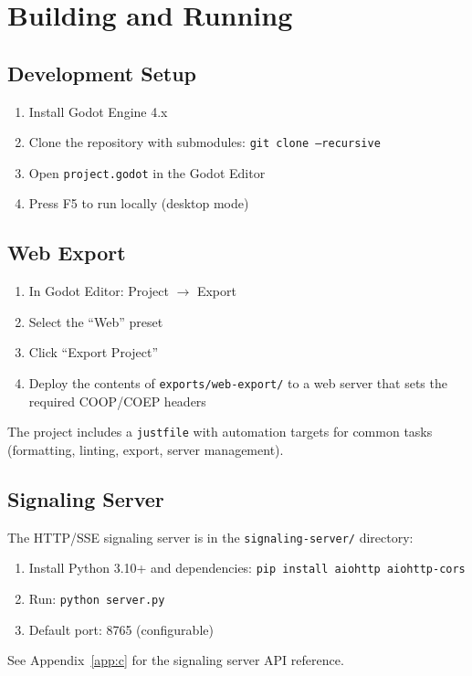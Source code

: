 \section{Building and Running}
\label{app:b:building}

\subsection{Development Setup}

\begin{enumerate}
    \item Install Godot Engine 4.x
    \item Clone the repository with submodules: \texttt{git clone --recursive}
    \item Open \texttt{project.godot} in the Godot Editor
    \item Press F5 to run locally (desktop mode)
\end{enumerate}

\subsection{Web Export}

\begin{enumerate}
    \item In Godot Editor: Project $\rightarrow$ Export
    \item Select the ``Web'' preset
    \item Click ``Export Project''
    \item Deploy the contents of \texttt{exports/web-export/} to a web server that sets the required COOP/COEP headers
\end{enumerate}

\noindent The project includes a \texttt{justfile} with automation targets for common tasks (formatting, linting, export, server management).

\subsection{Signaling Server}

The HTTP/SSE signaling server is in the \texttt{signaling-server/} directory:

\begin{enumerate}
    \item Install Python 3.10+ and dependencies: \texttt{pip install aiohttp aiohttp-cors}
    \item Run: \texttt{python server.py}
    \item Default port: 8765 (configurable)
\end{enumerate}

\noindent See Appendix~\ref{app:c} for the signaling server API reference.

